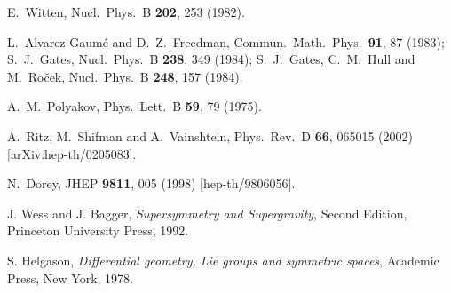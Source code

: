 \documentclass[epsfig,12pt]{article}
\begin{document}
\begin{thebibliography}{99}
  E.~Witten,
  Nucl.\ Phys.\  B {\bf 202}, 253 (1982).
  
 L.~Alvarez-Gaum\'{e} and D.~Z.~Freedman,
Commun.\ Math.\ Phys.\  {\bf 91}, 87 (1983);
S.~J.~Gates,
Nucl.\ Phys.\ B {\bf 238}, 349 (1984);
S.~J.~Gates, C.~M.~Hull and M.~Ro\v{c}ek,
Nucl.\ Phys.\ B {\bf 248}, 157 (1984).

 A.~M.~Polyakov,
  Phys.\ Lett.\  B {\bf 59}, 79 (1975).
  
  A.~Ritz, M.~Shifman and A.~Vainshtein,
  Phys.\ Rev.\  D {\bf 66}, 065015 (2002)
  [arXiv:hep-th/0205083].
  
N.~Dorey,
JHEP {\bf 9811}, 005 (1998) [hep-th/9806056].
  
J. Wess and J. Bagger, {\em Supersymmetry and Supergravity}, Second Edition,
Princeton University Press, 1992.

S. Helgason, {\em Differential geometry, Lie groups and symmetric spaces},
Academic Press, New York, 1978.


\end{thebibliography}
\end{document}
